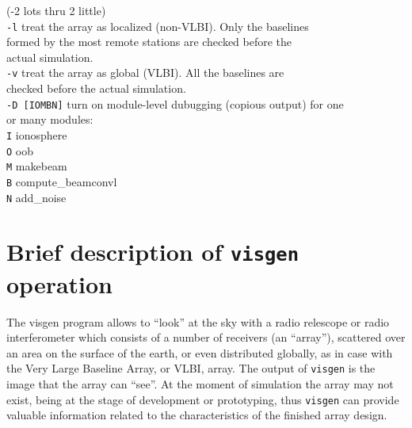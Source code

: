 \documentclass[letterpaper, oneside, 11pt]{article}
\begin{document}
\begin{tabbing}
		      \>(-2 lots thru 2 little) \\
{\tt -l}    \>treat the array as localized (non-VLBI). Only the baselines \\
		   \> formed by the most remote stations are checked before the \\
		   \>actual simulation. \\
{\tt -v}     \>treat the array as global (VLBI). All the baselines are \\
		   \> checked before the actual simulation. \\
{\tt -D [IOMBN]} \>turn on module-level dubugging (copious output) for one \\
	\> or many modules: \\
        \>         {\tt I} ionosphere \\
        \>         {\tt O} oob \\
        \>         {\tt M} makebeam \\
        \>         {\tt B} compute\_beamconvl \\
        \>         {\tt N} add\_noise \\
\end{tabbing}

\section{Brief description of {\tt visgen} operation}

The visgen program allows to ``look'' at the sky with a radio relescope or radio interferometer which consists of a number of receivers (an ``array''), scattered over an area on the surface of the earth, or even distributed globally, as in case with the Very Large Baseline Array, or VLBI, array. The output of {\tt visgen} is the image that the array can ``see''. At the moment of simulation the array may not exist, being at the stage of development or prototyping, thus {\tt visgen} can provide valuable information related to the characteristics of the finished array design. \\
\end{document}
